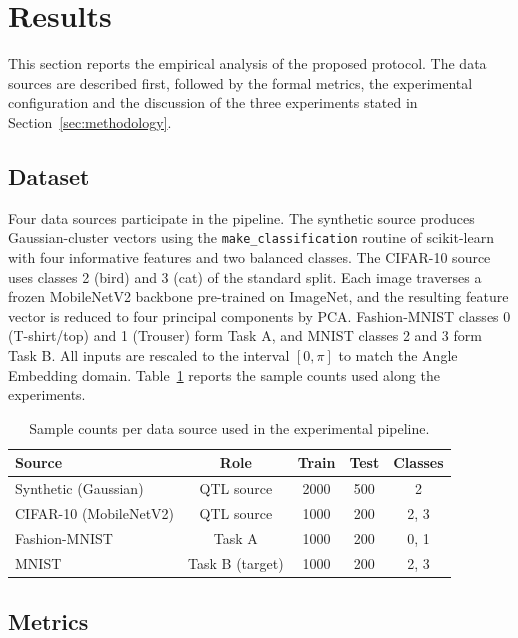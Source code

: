 \documentclass[runningheads]{llncs}
\begin{document}
\section{Results}\label{sec:results}

This section reports the empirical analysis of the proposed protocol. The data sources are described first, followed by the formal metrics, the experimental configuration and the discussion of the three experiments stated in Section~\ref{sec:methodology}.

\subsection{Dataset}

Four data sources participate in the pipeline. The synthetic source produces Gaussian-cluster vectors using the \texttt{make\_classification} routine of scikit-learn with four informative features and two balanced classes. The CIFAR-10 source uses classes 2 (bird) and 3 (cat) of the standard split. Each image traverses a frozen MobileNetV2 backbone pre-trained on ImageNet, and the resulting feature vector is reduced to four principal components by PCA. Fashion-MNIST classes 0 (T-shirt/top) and 1 (Trouser) form Task A, and MNIST classes 2 and 3 form Task B. All inputs are rescaled to the interval $[0,\pi]$ to match the Angle Embedding domain. Table~\ref{tab:datasets} reports the sample counts used along the experiments.

\begin{table}[ht]
\centering
\caption{Sample counts per data source used in the experimental pipeline.}
\label{tab:datasets}
\begin{tabular}{lcccc}
\toprule
Source & Role & Train & Test & Classes \\
\midrule
Synthetic (Gaussian)    & QTL source       & 2000 & 500 & 2 \\
CIFAR-10 (MobileNetV2)  & QTL source       & 1000 & 200 & 2, 3 \\
Fashion-MNIST           & Task A           & 1000 & 200 & 0, 1 \\
MNIST                   & Task B (target)  & 1000 & 200 & 2, 3 \\
\bottomrule
\end{tabular}
\end{table}

\subsection{Metrics}
\end{document}
